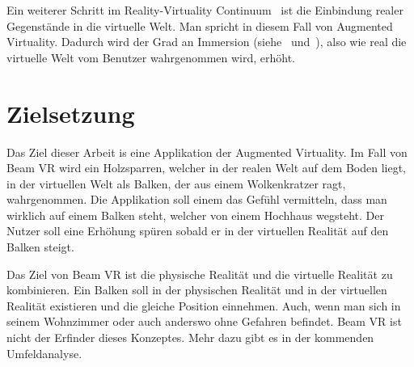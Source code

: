 Ein weiterer Schritt im Reality-Virtuality Continuum~\cite{MILGRAM_1994} ist die Einbindung realer Gegenstände in die virtuelle Welt.
Man spricht in diesem Fall von Augmented Virtuality.
Dadurch wird der Grad an Immersion (siehe~\cite{EMEST_ADAMS_2004} und~\cite{BJOERK_2003}), also wie real die virtuelle Welt vom Benutzer wahrgenommen wird, erhöht.

\section{Zielsetzung}
\label{sec: objective}

Das Ziel dieser Arbeit is eine Applikation der Augmented Virtuality.
Im Fall von Beam VR wird ein Holzsparren, welcher in der realen Welt auf dem Boden liegt, in der virtuellen Welt als Balken, der aus einem Wolkenkratzer ragt, wahrgenommen.
Die Applikation soll einem das Gefühl vermitteln, dass man wirklich auf einem Balken steht, welcher von einem Hochhaus wegsteht.
Der Nutzer soll eine Erhöhung spüren sobald er in der virtuellen Realität auf den Balken steigt.

Das Ziel von Beam VR ist die physische Realität und die virtuelle Realität zu kombinieren.
Ein Balken soll in der physischen Realität und in der virtuellen Realität existieren und die gleiche Position einnehmen.
Auch, wenn man sich in seinem Wohnzimmer oder auch anderswo ohne Gefahren befindet.
Beam VR ist nicht der Erfinder dieses Konzeptes.
Mehr dazu gibt es in der kommenden Umfeldanalyse.
